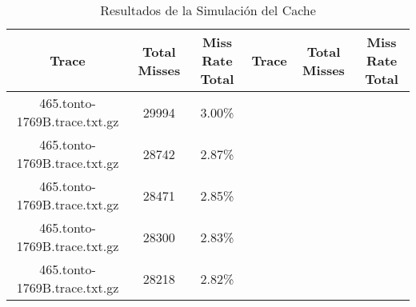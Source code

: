 \begin{table}[H]
\centering
\begin{tabular}{|c|c|c|c|c|c|}
\hline
Trace & Total Misses & Miss Rate Total & Trace & Total Misses & Miss Rate Total \\
\hline
465.tonto-1769B.trace.txt.gz & 29994 & 3.00\% & & & &  \\
465.tonto-1769B.trace.txt.gz & 28742 & 2.87\% & & & &  \\
465.tonto-1769B.trace.txt.gz & 28471 & 2.85\% & & & &  \\
465.tonto-1769B.trace.txt.gz & 28300 & 2.83\% & & & &  \\
465.tonto-1769B.trace.txt.gz & 28218 & 2.82\% & & & &  \\
\hline
\end{tabular}
\caption{Resultados de la Simulación del Cache}
\label{tab:cache_results}
\end{table}
